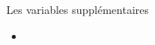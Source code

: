 \documentclass[12pt]{beamer}
\begin{document}

\begin{frame}{Les variables supplémentaires}

\begin{itemize}
\item  
\end{itemize}

\end{frame}

 
\end{document}
